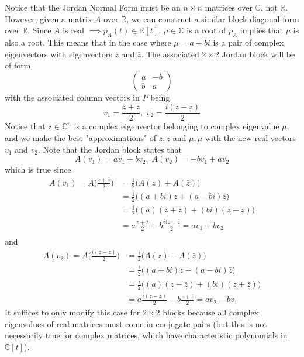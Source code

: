\documentclass{article}
\begin{document}
    Notice that the Jordan Normal Form must be an $n \times n$ matrices over $\mathbb{C}$, not $\mathbb{R}$. However, given a matrix $A$ over $\mathbb{R}$, we can construct a similar block diagonal form over $\mathbb{R}$. Since $A$ is real $\implies p_A (t) \in \mathbb{R}[t]$, $\mu \in \mathbb{C}$ is a root of $p_A$ implies that $\bar{\mu}$ is also a root. This means that in the case where $\mu = a \pm b i$ is a pair of complex eigenvectors with eigenvectors $z$ and $\bar{z}$. The associated $2 \times 2$ Jordan block will be of form
    \[\begin{pmatrix}
    a&-b\\ b&a
    \end{pmatrix}\]
    with the associated column vectors in $P$ being
    \[v_1 = \frac{z + \bar{z}}{2}, \; v_2 = \frac{i (z - \bar{z})}{2}\]
    Notice that $z \in \mathbb{C}^n$ is a complex eigenvector belonging to complex eigenvalue $\mu$, and we make the best "approximations" of $z, \bar{z}$ and $\mu, \bar{\mu}$ with the new real vectors $v_1$ and $v_2$. Note that the Jordan block states that
    \[A(v_1) = a v_1 + b v_2, \; A(v_2) = -b v_1 + a v_2\]
    which is true since 
    \begin{align*}
        A(v_1) = A\Big( \frac{z + \bar{z}}{2} \Big) & = \frac{1}{2} \big( A(z) + A(\bar{z}) \big) \\
        & = \frac{1}{2}\big( (a+bi)z + (a-bi) \bar{z} \big) \\
        & = \frac{1}{2} \big( (a)(z + \bar{z}) + (bi) (z - \bar{z})\big) \\
        & = a \frac{z + \bar{z}}{2} + b \frac{i(z-\bar{z}}{2} = a v_1 + b v_2 \\
    \end{align*}
    and 
    \begin{align*}
        A(v_2) = A \Big( \frac{i(z-\bar{z})}{2} \Big) & = \frac{i}{2} \big( A(z) - A(\bar{z}) \big) \\
        & = \frac{i}{2} \big( (a+bi) z - (a-bi) \bar{z}\big) \\
        & = \frac{i}{2} \big( (a) (z - \bar{z}) + (bi)(z+\bar{z})\big) \\
        & = a \frac{i(z-\bar{z})}{2} - b \frac{z + \bar{z}}{2} = a v_2 - b v_1
    \end{align*}
    It suffices to only modify this case for $2 \times 2$ blocks because all complex eigenvalues of real matrices must come in conjugate pairs (but this is not necessarily true for complex matrices, which have characteristic polynomials in $\mathbb{C}[t]$). 
\end{document}
